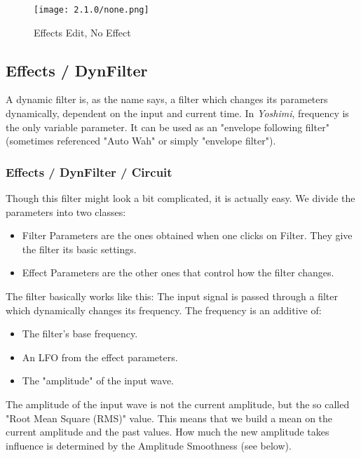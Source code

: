 \begin{figure}[H]
   \centering
   \texttt{[image: 2.1.0/none.png]}
   \caption{Effects Edit, No Effect}
   \label{fig:effects_edit_none}
\end{figure}

\subsection{Effects / DynFilter}
\label{subsec:effects_edit_dynfilter}

   A dynamic filter is, as the name says, a filter which changes its
   parameters dynamically, dependent on the input and current time. In
   \textsl{Yoshimi}, frequency is the only variable parameter. It can be
   used as an "envelope following filter" (sometimes referenced "Auto Wah" or
   simply "envelope filter").

\subsubsection{Effects / DynFilter / Circuit}
\label{subsubsec:effects_edit_dynfilter_circuit}

   Though this filter might look a bit complicated, it is actually easy. We
   divide the parameters into two classes:

   \begin{itemize}
      \item Filter Parameters are the ones obtained when one clicks on Filter.
         They give the filter its basic settings.
      \item Effect Parameters are the other ones that control how the filter
         changes.
   \end{itemize}

   The filter basically works like this: The input signal is passed through a
   filter which dynamically changes its frequency. The frequency is an
   additive of:

   \begin{itemize}
      \item The filter’s base frequency.
      \item An LFO from the effect parameters.
      \item The "amplitude" of the input wave.
   \end{itemize}

   The amplitude of the input wave is not the current amplitude, but the so
   called "Root Mean Square (RMS)" value. This means that we build a mean on
   the current amplitude and the past values. How much the new amplitude
   takes influence is determined by the Amplitude Smoothness (see below).

